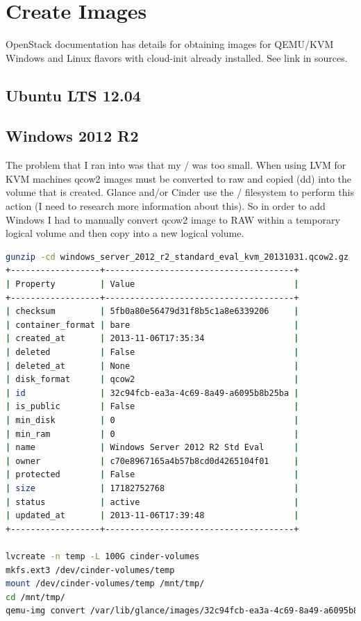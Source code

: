 \documentclass[11pt,letterpaper,oneside]{book}
\begin{document}
\section{Create Images}
OpenStack documentation has details for obtaining images for QEMU/KVM Windows and Linux flavors with cloud-init already installed. See link in sources.
\subsection{Ubuntu LTS 12.04}
\subsection{Windows 2012 R2}
The problem that I ran into was that my / was too small. When using LVM for KVM machines qcow2
images must be converted to raw and copied (dd) into the volume that is created. Glance and/or Cinder
use the / filesystem to perform this action (I need to research more information about this). So in order
to add Windows I had to manually convert qcow2 image to RAW within a temporary logical volume
and then copy into a new logical volume.
\begin{lstlisting}[caption={Windows 2012 R2 Image Create},language=bash]
gunzip -cd windows_server_2012_r2_standard_eval_kvm_20131031.qcow2.gz | glance image-create --name "Windows Server 2012 R2 Std Eval" --disk-format=qcow2 --container-format=bare 
+------------------+--------------------------------------+ 
| Property         | Value                                | 
+------------------+--------------------------------------+ 
| checksum         | 5fb0a80e56479d31f8b5c1a8e6339206     | 
| container_format | bare                                 | 
| created_at       | 2013-11-06T17:35:34                  | 
| deleted          | False                                | 
| deleted_at       | None                                 | 
| disk_format      | qcow2                                | 
| id               | 32c94fcb-ea3a-4c69-8a49-a6095b8b25ba | 
| is_public        | False                                | 
| min_disk         | 0                                    | 
| min_ram          | 0                                    | 
| name             | Windows Server 2012 R2 Std Eval      | 
| owner            | c70e8967165a4b57b8cd0d4265104f01     | 
| protected        | False                                | 
| size             | 17182752768                          | 
| status           | active                               | 
| updated_at       | 2013-11-06T17:39:48                  | 
+------------------+--------------------------------------+ 

lvcreate -n temp -L 100G cinder-volumes
mkfs.ext3 /dev/cinder-volumes/temp
mount /dev/cinder-volumes/temp /mnt/tmp/ 
cd /mnt/tmp/ 
qemu-img convert /var/lib/glance/images/32c94fcb-ea3a-4c69-8a49-a6095b8b25ba -O raw ./windows.raw
\end{lstlisting}
\end{document}
